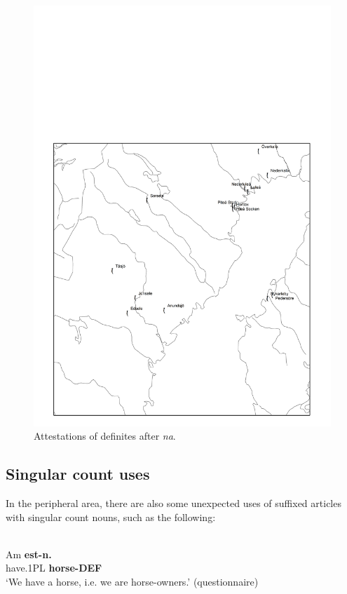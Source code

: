 \begin{figure}[h]
\includegraphics{figures_mod/image15}
\caption{Attestations of definites after \textit{na}.}
\label{map:15}

\end{figure}

\subsection{ Singular count uses}
\label{bkm:Ref224379285}

In the peripheral area, there are also some unexpected uses of suffixed articles with singular count nouns, such as the following:

\ea \label{} 
\\
\gll Am  \textbf{est-n.}\\
have.1PL  \textbf{horse-DEF}\\
\glt ‘We have a horse, i.e. we are horse-owners.’ (questionnaire)

